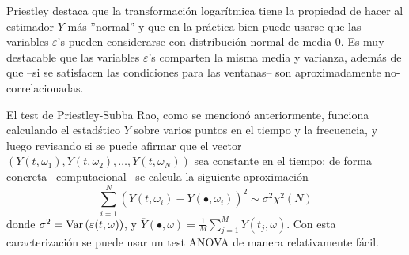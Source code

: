 %
%
%

Priestley \cite{Priestley81} destaca que la transformaci\'on logar\'itmica tiene la propiedad
de hacer al estimador $Y$ m\'as ''normal'' y que en la pr\'actica bien puede usarse que las
variables $\varepsilon$'s pueden considerarse con distribuci\'on normal de media 0.
Es muy destacable que las variables $\varepsilon$'s comparten la misma media y varianza, 
adem\'as de que --si se satisfacen las condiciones para las ventanas-- son
aproximadamente no-correlacionadas.


El test de Priestley-Subba Rao, como se mencion\'o anteriormente, funciona calculando el
estad\'stico $Y$ sobre varios puntos en el tiempo y la frecuencia, y luego revisando si se puede
afirmar que el vector 
$\left( Y(t,\omega_1), Y(t,\omega_2), \dots, Y(t,\omega_N) \right)$ sea constante en el tiempo;
de forma concreta --computacional-- se calcula la siguiente aproximaci\'on
\begin{equation*}
\sum_{i = 1 }^{N} \left( Y(t,\omega_i) - \overline{Y}(\bullet,\omega_i) \right)^{2} 
\sim \sigma^{2} \chi^{2}(N)
\end{equation*}
donde $\sigma^{2} = \mathrm{Var}\left( \varepsilon(t,\omega) \right)$, y
$\overline{Y}(\bullet,\omega) = \frac{1}{M} \sum_{j=1}^{M} Y(t_j,\omega)$.
Con esta caracterizaci\'on se puede usar un test ANOVA de manera relativamente f\'acil.


